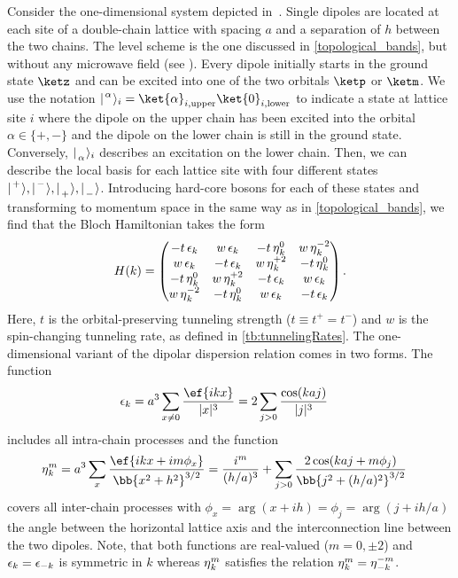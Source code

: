 Consider the one-dimensional system depicted in~.
Single dipoles are located at each site of a double-chain lattice with spacing $a$ and a separation of $h$ between the two chains.
The level scheme is the one discussed in \cref{topological_bands}, but without any microwave field (see ). Every dipole initially starts in the ground state $\ketz$ and can be excited into one of the two orbitals $\ketp$ or $\ketm$.
We use the notation $\ladderKet{\alpha}{}_i = \ket{\alpha}_{i,\text{upper}} \ket{0}_{i,\text{lower}}$ to indicate a state at lattice site $i$ where the dipole on the upper chain has been excited into the orbital $\alpha \in \{+, -\}$ and the dipole on the lower chain is still in the ground state.
Conversely, $\ladderKet{}{\alpha}_i$ describes an excitation on the lower chain.
Then, we can describe the local basis for each lattice site with four different states $\upp, \upm, \dnp, \dnm$.
Introducing hard-core bosons for each of these states and transforming to momentum space in the same way as in \cref{topological_bands}, we find that the Bloch Hamiltonian takes the form
\begin{align}
    H(k) =
    \begin{pmatrix}
        -t \operatorname{\epsilon}_k  & w \operatorname{\epsilon}_k & -t \operatorname{\eta}^0_k & w \operatorname{\eta}^{-2}_k \\
        w \operatorname{\epsilon}_k & -t \operatorname{\epsilon}_k  & w \operatorname{\eta}^{+2}_k & -t \operatorname{\eta}^0_k \\
        -t \operatorname{\eta}^0_{k} & w \operatorname{\eta}^{+2}_{k}  & -t \operatorname{\epsilon}_k  & w \operatorname{\epsilon}_k \\
        w \operatorname{\eta}^{-2}_{k} & -t \operatorname{\eta}^0_{k} & w \operatorname{\epsilon}_k & -t \operatorname{\epsilon}_k
    \end{pmatrix}.
\end{align}
Here, $t$ is the orbital-preserving tunneling strength ($t \equiv t^+ = t^-$) and $w$ is the spin-changing tunneling rate, as defined in \cref{tb:tunnelingRates}.
The one-dimensional variant of the dipolar dispersion relation comes in two forms. The function
\begin{align}
    \ep_k &= a^3 \sum_{x\ne 0} \frac{\ef{i k x}}{|x|^3} = 2 \sum_{j>0} \frac{\cos(k a j)}{|j|^3}
\end{align}
includes all intra-chain processes and the function
\begin{align}
    \et^m_k &= a^3 \sum_{x} \frac{\ef{i k x + i m \phi_x}}{\bb{x^2 + h^2}^{3/2}}
    = \frac{i^m}{(h/a)^3} + \sum_{j>0} \frac{2\cos(ka j+m\phi_j)}{\bb{j^2+(h/a)^2}^{3/2}}
\end{align}
covers all inter-chain processes with $\phi_x = \arg(x+ i h)=\phi_j=\arg(j+ i h/a)$ the angle between the horizontal lattice axis and the interconnection line between the two dipoles.
Note, that both functions are real-valued ($m = 0, \pm 2$) and $\operatorname{\epsilon}_k=\operatorname{\epsilon}_{-k}$ is symmetric in $k$ whereas $\operatorname{\eta}^m_k$ satisfies the relation $\operatorname{\eta}^m_k=\operatorname{\eta}^{-m}_{-k}$.

